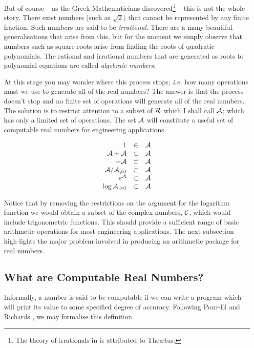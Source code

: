 But of course -- as the Greek Mathematicians discovered\footnote{The
theory of irrationals in \cite{EUCLID} is attributed to The\ae{}tus.}
-- this is not the whole story. There exist numbers (such as
$\sqrt{2}$) that cannot be represented by any finite fraction. Such
numbers are said to be {\em irrational}. There are a many beautiful
generalisations that arise from this, but for the moment we simply
observe that numbers such as square roots arise from finding the roots
of quadratic polynomials. The rational and irrational numbers that are
generated as roots to polynomial equations are called {\em algebraic
numbers}.

At this stage you may wonder where this process stops; {\it i.e.\/}
how many operations must we use to generate all of the real numbers?
The answer is that the process doesn't stop and no finite set of
operations will generate all of the real numbers. The solution is to
restrict attention to a subset of ${\cal R}$ which I shall call ${\cal
A}$; which has only a limited set of operations.  The set ${\cal A}$
will constitute a useful set of computable real numbers for
engineering applications.

\[\begin{array}{rcl}
1 & \in & {\cal A}\\
{\cal A}+{\cal A}& \subset & {\cal A}\\
-{\cal A}& \subset & {\cal A}\\
{\cal A}/{\cal A}_{\not= 0}& \subset & {\cal A}\\
e^{{\cal A}}& \subset & {\cal A}\\
\log {\cal A}_{\, > 0}& \subset & {\cal A}
\end{array}\]

Notice that by removing the restrictions on the argument for the
logarithm function we would obtain a subset of the complex numbers,
${\cal C}$, which would include trigonometric functions. This should
provide a sufficient range of basic arithmetic operations for most
engineering applications. The next subsection high-lights the major
problem involved in producing an arithmetic package for real numbers.

\subsection{What are Computable Real Numbers?}

Informally, a number is said to be computable if we can write a
program which will print its value to some specified degree of
accuracy. Following Pour-El and Richards , we may
formalise this definition.

